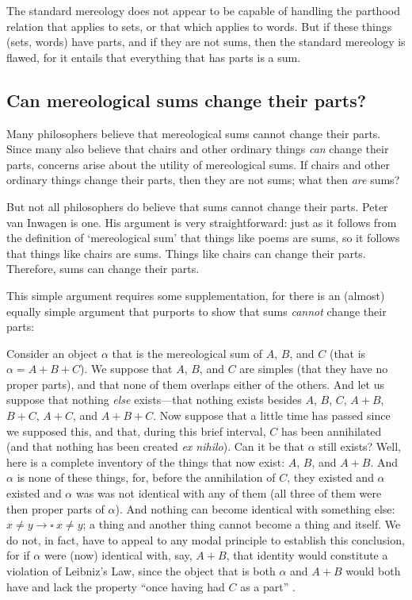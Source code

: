 \documentclass[11pt]{article}
\newenvironment{squote}{%
\begin{spacing}{1}
\begin{list}{}{%
\setlength{\labelwidth}{0pt}%
\rightmargin\leftmargin%
}
\item\relax
}{%
\end{list}%
\end{spacing}
}
\begin{document}
\begin{spacing}{1.5}
The standard mereology does not appear to be capable of handling the
parthood relation that applies to sets, or that which applies to
words.  But if these things (sets, words) have parts, and if they are
not sums, then the standard mereology is flawed, for it entails that
everything that has parts is a sum.

\subsection{Can mereological sums change their parts?}
\label{change}
Many philosophers believe that mereological sums cannot change their
parts.  Since many also believe that chairs and other ordinary things
{\em can} change their parts, concerns arise about the utility of
mereological sums.  If chairs and other ordinary things change their
parts, then they are not sums; what then {\em are} sums?

But not all philosophers do believe that sums cannot change their
parts.  Peter van Inwagen is one.  His argument is very
straightforward:  just as it follows from the definition of
`mereological sum' that things like poems are sums, so it follows that
things like chairs are sums.  Things like chairs can change their
parts.  Therefore, sums can change their parts.

This simple argument requires some supplementation, for there is an
(almost) equally simple argument that purports to show that sums {\em
  cannot} change their parts:

\begin{squote}
Consider an object $\alpha$ that is the mereological sum of $A$, $B$,
and $C$ (that is $\alpha = A + B + C$).  We suppose that $A$, $B$, and
$C$ are simples (that they have no proper parts), and that none of
them overlaps either of the others.  And let us suppose that nothing
{\em else} exists---that nothing exists besides $A$, $B$, $C$, $A +
B$, $B + C$, $A + C$, and $A + B + C$.  Now suppose that a little time
has passed since we supposed this, and that, during this brief
interval, $C$ has been annihilated (and that nothing has been created
{\em ex nihilo}).  Can it be that $\alpha$ still exists?  Well, here
is a complete inventory of the things that now exist: $A$, $B$, and $A
+ B$.  And $\alpha$ is none of these things, for, before the
annihilation of $C$, they existed and $\alpha$ existed and $\alpha$
was was not identical with any of them (all three of them were then
proper parts of $\alpha$).  And nothing can become identical with
something else: $x \neq y \rightarrow \square\ x \neq y$; a thing and
another thing cannot become a thing and itself.  We do not, in fact,
have to appeal to any modal principle to establish this conclusion,
for if $\alpha$ were (now) identical with, say, $A + B$, that identity
would constitute a violation of Leibniz's Law, since the object that
is both $\alpha$ and $A + B$ would both have and lack the property
``once having had $C$ as a part'' \citep[629]{inwagen2006}.
\end{squote}


\end{spacing}
\end{document}
